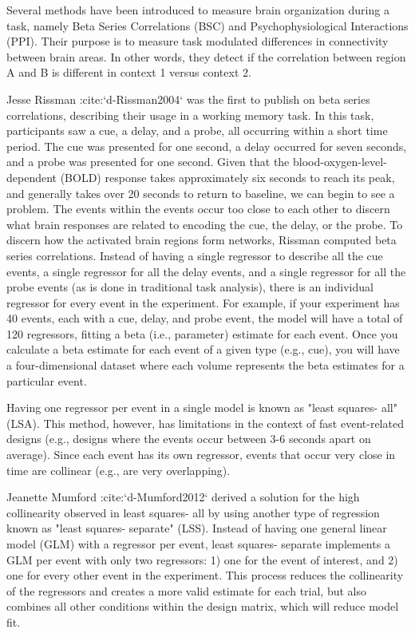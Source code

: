 \documentclass[phd,appendix,figures]{uithesis}
\begin{document}
Several methods have been introduced to measure brain organization during a task,
namely Beta Series Correlations (BSC) and Psychophysiological Interactions (PPI).
Their purpose is to measure task modulated differences in connectivity between brain areas.
In other words, they detect if the correlation between region A and B is different
in context 1 versus context 2.

Jesse Rissman :cite:`d-Rissman2004` was the first to publish on beta series
correlations, describing their usage in a working memory task.
In this task, participants saw a cue, a delay, and a probe, all occurring
within a short time period.
The cue was presented for one second, a delay occurred for seven seconds,
and a probe was presented for one second.
Given that the blood-oxygen-level-dependent (BOLD) response
takes approximately six seconds to reach its peak, and generally takes over
20 seconds to return to baseline, we can begin to see a problem.
The events within the events occur too close to each other to discern what
brain responses are related to encoding the cue, the delay, or the probe.
To discern how the activated brain regions form networks, Rissman
computed beta series correlations.
Instead of having a single regressor to describe all the cue events,
a single regressor for all the delay events, and a single regressor for all the
probe events (as is done in traditional task analysis),
there is an individual regressor for every event in the experiment.
For example, if your experiment has 40 events, each with a cue, delay, and
probe event, the model will have a total of 120 regressors, fitting a beta
(i.e., parameter) estimate for each event.
Once you calculate a beta estimate for each event of a given type
(e.g., cue), you will have a four-dimensional dataset where each volume
represents the beta estimates for a particular event.

Having one regressor per event in a single model is known as "least squares- all" (LSA).
This method, however, has limitations in the context of fast event-related
designs (e.g., designs where the events occur between 3-6
seconds apart on average).
Since each event has its own regressor, events that occur very close in time
are collinear (e.g., are very overlapping).

Jeanette Mumford :cite:`d-Mumford2012` derived a solution for
the high collinearity observed in least squares- all by using another
type of regression known as "least squares- separate" (LSS).
Instead of having one general linear model (GLM) with a regressor per event,
least squares- separate implements a GLM per event with only two regressors:
1) one for the event of interest, and 2) one for every other event in the
experiment.
This process reduces the collinearity of the regressors and creates a more valid
estimate for each trial, but also combines all other conditions
within the design matrix, which will reduce model fit.
\end{document}
